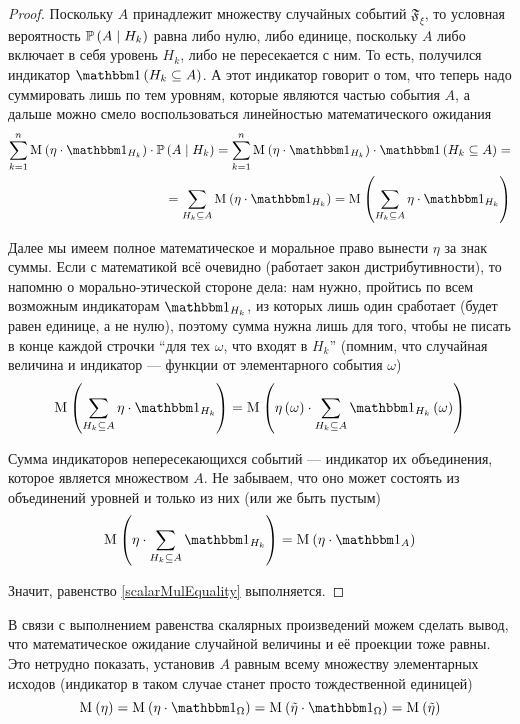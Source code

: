 \begin{proof}
Поскольку $A$ принадлежит множеству случайных событий $\mathfrak{F}_\xi$,
то условная вероятность $\mathbb{P}\left( A\mid H_k \right)$ равна либо нулю, либо единице,
поскольку $A$ либо включает в себя уровень $H_k$, либо не пересекается с ним.
То есть, получился индикатор $\indicator{H_k \subseteq A}$.
А этот индикатор говорит о том, что теперь надо суммировать лишь по тем уровням,
которые являются частью события $A$,
а дальше можно смело воспользоваться линейностью математического ожидания
\begin{align*}
\sum_{k=1}^n \mean{\left( \eta \cdot \indicatorof{H_k} \right)}
    \cdot \probability{A \mid H_k}
    = \sum_{k=1}^n \mean{\left( \eta \cdot \indicatorof{H_k} \right)}
        \cdot \indicator{H_k \subseteq A} = \\
    = \sum_{H_k \subseteq A} \mean{\left( \eta \cdot \indicatorof{H_k} \right)}
    = \mean{\left( \sum_{H_k \subseteq A} \eta \cdot \indicatorof{H_k} \right)}
\end{align*}

Далее мы имеем полное математическое и моральное право
вынести $\eta$ за знак суммы.
Если с математикой всё очевидно (работает закон дистрибутивности),
то напомню о морально-этической стороне дела: нам нужно,
пройтись по всем возможным индикаторам $\indicatorof{H_k}$,
из которых лишь один сработает (будет равен единице, а не нулю),
поэтому сумма нужна лишь для того,
чтобы не писать в конце каждой строчки ``для тех $\omega$, что входят в $H_k$''
(помним, что случайная величина и индикатор --- функции
от элементарного события $\omega$)
$$\mean{\left( \sum_{H_k \subseteq A} \eta \cdot \indicatorof{H_k} \right)}
    = \mean{\left( \eta \left( \omega \right) \cdot \sum_{H_k \subseteq A}
        \indicatorof{H_k}\left( \omega \right) \right)}$$

Сумма индикаторов непересекающихся событий --- индикатор их объединения,
которое является множеством $A$.
Не забываем, что оно может состоять из объединений уровней и только из них
(или же быть пустым)
$$\mean{\left( \eta \cdot \sum_{H_k \subseteq A} \indicatorof{H_k} \right)}
    = \mean{\left( \eta \cdot \indicatorof{A} \right)}$$

Значит, равенство \eqref{scalarMulEquality} выполняется.
\end{proof}

\begin{remark}
    В связи с выполнением равенства скалярных произведений можем сделать вывод,
    что математическое ожидание случайной величины и её проекции тоже равны.
    Это нетрудно показать,
    установив $A$ равным всему множеству элементарных исходов
    (индикатор в таком случае станет просто тождественной единицей)
    $$\mean{\left( \eta \right)}
        = \mean{\left( \eta \cdot \indicatorof{\Omega} \right)}
        = \mean{\left( \tilde{\eta} \cdot \indicatorof{\Omega} \right)}
        = \mean{\left( \tilde{\eta} \right)}$$
\end{remark}

